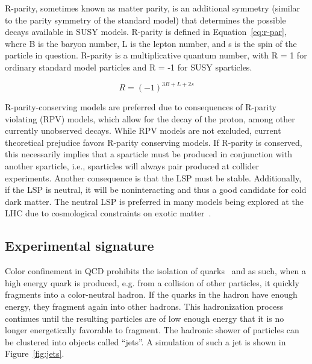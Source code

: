 R-parity, sometimes known as matter parity, is an additional symmetry (similar to
the parity symmetry of the standard model) that determines the possible decays available
in SUSY models. R-parity is defined in Equation~\ref{eq:r-par}, where B is the baryon number, L is the
lepton number, and s is the spin of the particle in question. R-parity is a multiplicative
quantum number, with R = 1 for ordinary standard model particles and R = -1 for SUSY sparticles.

\begin{equation}
\label{eq:r-par}
R = \left(-1\right)^{3B+L+2s}
\end{equation}

R-parity-conserving models are preferred due to consequences of R-parity violating (RPV)
models, which allow for the decay of the proton, among other currently unobserved decays. 
While RPV models are not excluded, current theoretical prejudice favors R-parity 
conserving models.
If R-parity is conserved, this necessarily implies that a sparticle must be produced
in conjunction with another sparticle, i.e., sparticles will always pair produced at collider
experiments. Another consequence is that the LSP must be stable. Additionally, if the LSP
is neutral, it will be noninteracting and thus a good candidate for cold dark matter. The
neutral LSP is preferred in many models being explored at the LHC due to cosmological
constraints on exotic matter~\cite{wess1992supersymmetry}.

\subsection{Experimental signature}
\label{sec:signature}

Color confinement in QCD prohibits the isolation of quarks~\cite{Ellis:1991qj} 
and as such, when a high energy quark is produced, e.g. 
from a collision of other particles, it quickly fragments into a 
color-neutral hadron. If the quarks in the hadron have enough energy, 
they fragment again into other hadrons. This hadronization process 
continues until the resulting particles are of low enough energy that it
is no longer energetically favorable to fragment. The hadronic shower of
 particles can be clustered into objects called ``jets''. A simulation 
of such a jet is shown in Figure~\ref{fig:jets}.  

